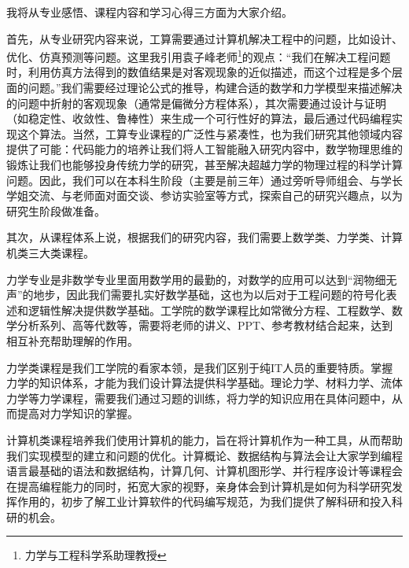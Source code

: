 \documentclass[11pt,oneside]{book}
\begin{document}
我将从专业感悟、课程内容和学习心得三方面为大家介绍。

\vspace{10pt}

首先，从专业研究内容来说，工算需要通过计算机解决工程中的问题，比如设计、优化、仿真预测等问题。这里我引用袁子峰老师\footnote{力学与工程科学系助理教授}的观点：“我们在解决工程问题时，利用仿真方法得到的数值结果是对客观现象的近似描述，而这个过程是多个层面的问题。”我们需要经过理论公式的推导，构建合适的数学和力学模型来描述解决的问题中折射的客观现象（通常是偏微分方程体系），其次需要通过设计与证明（如稳定性、收敛性、鲁棒性）来生成一个可行性好的算法，最后通过代码编程实现这个算法。当然，工算专业课程的广泛性与紧凑性，也为我们研究其他领域内容提供了可能：代码能力的培养让我们将人工智能融入研究内容中，数学物理思维的锻炼让我们也能够投身传统力学的研究，甚至解决超越力学的物理过程的科学计算问题。因此，我们可以在本科生阶段（主要是前三年）通过旁听导师组会、与学长学姐交流、与老师面对面交谈、参访实验室等方式，探索自己的研究兴趣点，以为研究生阶段做准备。

\vspace{10pt}

其次，从课程体系上说，根据我们的研究内容，我们需要上数学类、力学类、计算机类三大类课程。

\vspace{10pt}

力学专业是非数学专业里面用数学用的最勤的，对数学的应用可以达到“润物细无声”的地步，因此我们需要扎实好数学基础，这也为以后对于工程问题的符号化表述和逻辑性解决提供数学基础。工学院的数学课程比如常微分方程、工程数学、数学分析系列、高等代数等，需要将老师的讲义、PPT、参考教材结合起来，达到相互补充帮助理解的作用。

\vspace{10pt}

力学类课程是我们工学院的看家本领，是我们区别于纯IT人员的重要特质。掌握力学的知识体系，才能为我们设计算法提供科学基础。理论力学、材料力学、流体力学等力学课程，需要我们通过习题的训练，将力学的知识应用在具体问题中，从而提高对力学知识的掌握。

\vspace{10pt}

计算机类课程培养我们使用计算机的能力，旨在将计算机作为一种工具，从而帮助我们实现模型的建立和问题的优化。计算概论、数据结构与算法会让大家学到编程语言最基础的语法和数据结构，计算几何、计算机图形学、并行程序设计等课程会在提高编程能力的同时，拓宽大家的视野，亲身体会到计算机是如何为科学研究发挥作用的，初步了解工业计算软件的代码编写规范，为我们提供了解科研和投入科研的机会。
\end{document}
